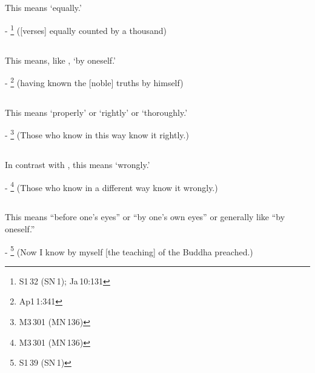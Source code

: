 \subsection*{}\label{nip:samadm}
This means `equally.'\par
- \footnote{S1\,32 (SN\,1); Ja\,10:131} ([verses] equally counted by a thousand) \par

\subsection*{}\label{nip:saamadm}
This means, like , `by oneself.'\par
- \footnote{Ap1\,1:341} (having known the [noble] truths by himself) \par

\subsection*{}\label{nip:sammaa}
This means `properly' or `rightly' or `thoroughly.'\par
- \footnote{M3\,301 (MN\,136)} (Those who know in this way know it rightly.) \par

\subsection*{}\label{nip:micchaa}
In contrast with , this means `wrongly.'\par
- \footnote{M3\,301 (MN\,136)} (Those who know in a different way know it wrongly.) \par

\subsection*{}\label{nip:sakkhi}
This means ``before one's eyes'' or ``by one's own eyes'' or generally like ``by oneself.''\par
- \footnote{S1\,39 (SN\,1)} (Now I know by myself [the teaching] of the Buddha preached.) \par

